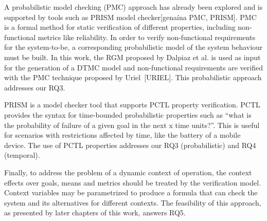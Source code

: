 
A probabilistic model checking (PMC) approach has already been explored and is supported by tools such as PRISM model checker[genaína PMC, PRISM]. PMC is a formal method for static verification of different properties, including non-functional metrics like reliability. In order to verify non-functional requirements for the system-to-be, a corresponding probabilistic model of the system behaviour must be built. In this work, the RGM proposed by Dalpiaz et al. is used as input for the generation of a DTMC model and non-functional requirements are verified with the PMC technique proposed by Uriel~[URIEL]. This probabilistic approach addresses our RQ3.

PRISM is a model checker tool that supports PCTL property verification. PCTL provides the syntax for time-bounded probabilistic properties such as ``what is the probability of failure of a given goal in the next x time units?''. This is useful for scenarios with restrictions affected by time, like the battery of a mobile device. The use of PCTL properties addresses our RQ3 (probabilistic) and RQ4 (temporal).


Finally, to address the problem of a dynamic context of operation, the context effects over goals, means and metrics should be treated by the verification model. Context variables may be parametrized to produce a formula that can check the system and its alternatives for different contexts. The feasibility of this approach, as presented by later chapters of this work, answers RQ5. 


